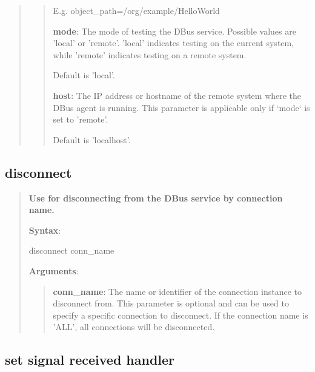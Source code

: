 \begin{quote}
\begin{quote}
  E.g. object\_path=/org/example/HelloWorld

\vspace{\baselineskip}

\textbf{mode}: The mode of testing the DBus service. Possible values are 'local' or 'remote'.
  'local' indicates testing on the current system, while 'remote' indicates testing on a remote system.

  Default is 'local'.

\vspace{\baselineskip}

\textbf{host}: The IP address or hostname of the remote system where the DBus agent is running.
                 This parameter is applicable only if `mode` is set to 'remote'.

				 Default is 'localhost'.
\end{quote}
\end{quote}

\hypertarget{description-disconnect}{%
\subsection{\texorpdfstring{\textbf{disconnect}}{disconnect}}\label{description-disconnect}}

\begin{quote}
\textbf{Use for disconnecting from the DBus service by connection name.}

\textbf{Syntax}:

\begin{robotcode}
disconnect 		conn_name
\end{robotcode}

\textbf{Arguments}:

\begin{quote}
\textbf{conn\_name}: The name or identifier of the connection instance to disconnect from.
This parameter is optional and can be used to specify a specific connection
to disconnect. If the connection name is 'ALL', all connections will be disconnected.
\end{quote}
\end{quote}

\hypertarget{description-set-signal-received-handler}{%
\subsection{\texorpdfstring{\textbf{set signal received handler}}{set signal received handler}}\label{description-set-signal-received-handler}}

